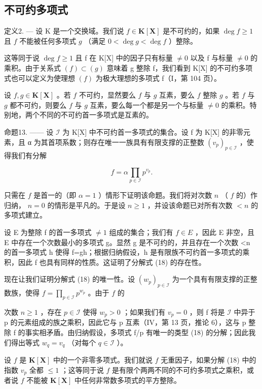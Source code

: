 \subsection{不可约多项式}

定义2. --- 设 K 是一个交换域。我们说 \(f \in \mathbf{K}[\mathbf{X}]\) 是不可约的，如果 \(\deg f \geqslant 1\) 且 \(f\) 不能被任何多项式 \(g\) （满足 \(0 < \deg g < \deg f\) ）整除。

这等同于说 \(\deg f \geqslant 1\) 且 f 在 K{[}X{]} 中的因子只有标量 \(\neq 0\) 以及 f 与标量 \(\neq 0\) 的乘积。由于关系式 \((f) \subset (g)\) 意味着 g 整除 f，我们看到 K{[}X{]} 的不可约多项式也可以定义为使理想 \((f)\) 为极大理想的多项式 f（I，第 104 页）。

设 \(f, g \in \mathbf{K}[\mathbf{X}]\) 。若 \(f\) 不可约，显然要么 \(f\) 与 \(g\) 互素，要么 \(f\) 整除 \(g\) 。若 \(f\) 与 \(g\) 都不可约，则要么 \(f\) 与 \(g\) 互素，要么每一个都是另一个与标量 \(\neq 0\) 的乘积。特别地，两个不同的不可约首一多项式是互素的。

命题13. —— 设 \(\mathcal{I}\) 为 K{[}X{]} 中不可约首一多项式的集合。设 f 为 K{[}X{]} 的非零元素，且 α 为其首项系数；则存在唯一一族具有有限支撑的正整数 \((v_{p})_{p\in \mathcal{I}}\) ，使得我们有分解

\[
f = \alpha \prod_ {p \in \mathcal {I}} p ^ {v _ {p}}.\tag{18}
\]

只需在 \(f\) 是首一的（即 \(\alpha = 1\) ）情形下证明该命题。我们将对次数 \(n\) （ \(f\) 的）作归纳， \(n = 0\) 的情形是平凡的。于是设 \(n \geqslant 1\) ，并设该命题已对所有次数 \(< n\) 的多项式建立。

设 E 为整除 f 的首一多项式 \(\neq1\) 组成的集合；我们有 \(f\in E\) ，因此 E 非空，且 E 中存在一个次数最小的多项式 g。显然 g 是不可约的，并且存在一个次数 \textless n 的首一多项式 h 使得 f=gh；根据归纳假设，h 是有限族不可约首一多项式的乘积，因此 f 也具有同样的性质。这证明了分解式 (18) 的存在性。

现在让我们证明分解式 (18) 的唯一性。设 \((w_{p})_{p\in \mathcal{I}}\) 为一个具有有限支撑的正整数族，使得 \(f = \prod_{p\in \mathcal{I}}p^{w_p}\) 。由于 \(f\) 的

次数 \(n \geqslant 1\) ，存在 \(p \in \mathcal{I}\) 使得 \(w_{p} > 0\) ；如果我们有 \(v_{p} = 0\) ，则 f 将是 \(\mathcal{I}\) 中异于 p 的元素组成的族之乘积，因此它与 p 互素（IV，第 13 页，推论 6），这与 p 整除 f 的事实相矛盾。由归纳假设，多项式 f/p 有唯一的类型 (18) 的分解；因此我们得出等式 \(w_{q} = v_{q}\) （对每个 \(q \in \mathcal{I}\) ）。

设 \(f\) 是 \(\mathbf{K}[\mathbf{X}]\) 中的一个非零多项式。我们就说 \(f\) 无重因子，如果分解 (18) 中的指数 \(v_{p}\) 全都 \(\leqslant 1\) ；这等同于说 \(f\) 是有限个两两不同的不可约多项式之乘积，或者说 \(f\) 不能被 \(\mathbf{K}[\mathbf{X}]\) 中任何非常数多项式的平方整除。

